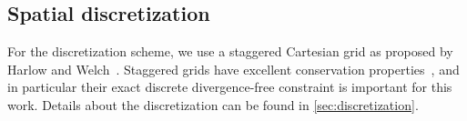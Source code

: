 \documentclass[preprint]{elsarticle}
\newcommand{\figsize}{\small}
\begin{document}
\subsection{Spatial discretization} \label{sec:spatial_discretization}

For the discretization scheme, we use a staggered Cartesian grid as proposed by
Harlow and Welch~\cite{Harlow1965}. Staggered grids have excellent conservation
properties~\cite{Lilly1965,Perot2011}, and in particular their exact discrete
divergence-free constraint is important for this work. Details about the
discretization can be found in \ref{sec:discretization}.

\begin{figure}
    \centering
    \def\svgwidth{0.60\columnwidth}
\begingroup%
  \makeatletter%
  \providecommand\color[2][]{%
    \errmessage{(Inkscape) Color is used for the text in Inkscape, but the package 'color.sty' is not loaded}%
    \renewcommand\color[2][]{}%
  }%
  \providecommand\transparent[1]{%
    \errmessage{(Inkscape) Transparency is used (non-zero) for the text in Inkscape, but the package 'transparent.sty' is not loaded}%
    \renewcommand\transparent[1]{}%
  }%
  \providecommand\rotatebox[2]{#2}%
  \newcommand*\fsize{\dimexpr\f@size pt\relax}%
  \newcommand*\lineheight[1]{\fontsize{\fsize}{#1\fsize}\selectfont}%
  \ifx\svgwidth\undefined%
    \setlength{\unitlength}{553.25643224bp}%
    \ifx\svgscale\undefined%
      \relax%
    \else%
      \setlength{\unitlength}{\unitlength * \real{\svgscale}}%
    \fi%
  \else%
    \setlength{\unitlength}{\svgwidth}%
  \fi%
  \global\let\svgwidth\undefined%

\end{figure}
\end{document}
